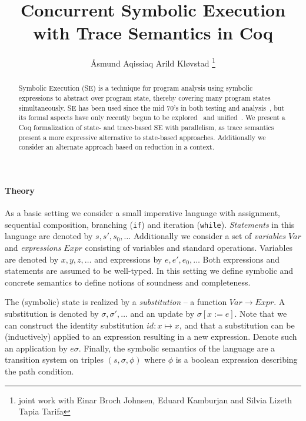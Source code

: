 \documentclass[submission,copyright,creativecommons]{eptcs}
\title{Concurrent Symbolic Execution with Trace Semantics in Coq}
\author{Åsmund Aqissiaq Arild Kløvstad
  \footnote{joint work with Einar Broch Johnsen, Eduard Kamburjan and Silvia Lizeth Tapia Tarifa}
\institute{University of Oslo, Oslo, Norway}
\email{aaklovst@ifi.uio.no}
}
\begin{document}
\maketitle

\begin{abstract}
  Symbolic Execution (SE) is a technique for program analysis using symbolic expressions to abstract over program state,
  thereby covering many program states simultaneously. SE has been used since the mid 70's in both testing and analysis~\cite{king1976symbolic, boyer1975select},
  but its formal aspects have only recently begun to be explored~\cite{boer2021} and unified~\cite{Steinhoefel2022}.
  We present a Coq formalization of state- and trace-based SE with parallelism, as trace semantics present
  a more expressive alternative to state-based approaches.
  Additionally we consider an alternate approach based on reduction in a context.
\end{abstract}

\paragraph{Theory~\cite{boer2021}}
As a basic setting we consider a small imperative language with assignment,
sequential composition, branching (\texttt{if}) and iteration (\texttt{while}).
\emph{Statements} in this language are denoted by $s, s', s_{0},\ldots$
Additionally we consider a set of \emph{variables} $Var$ and \emph{expressions} $Expr$ consisting of variables and
standard operations. Variables are denoted by $x,y,z, \ldots$ and expressions by $e, e', e_{0},\ldots$
Both expressions and statements are assumed to be well-typed.
In this setting we define symbolic and concrete semantics to define notions of soundness and completeness.

The (symbolic) state is realized by a \emph{substitution} -- a function $Var \rightarrow Expr$.
A substitution is denoted by $\sigma, \sigma', \ldots$ and an update by $\sigma[x := e]$.
Note that we can construct the identity substitution $id : x \mapsto x$,
and that a substitution can be (inductively) applied to an expression resulting in a new expression.
Denote such an application by $e\sigma$.
Finally, the symbolic semantics of the language are a transition system on triples $(s, \sigma, \phi)$
where $\phi$ is a boolean expression describing the path condition.
\end{document}
